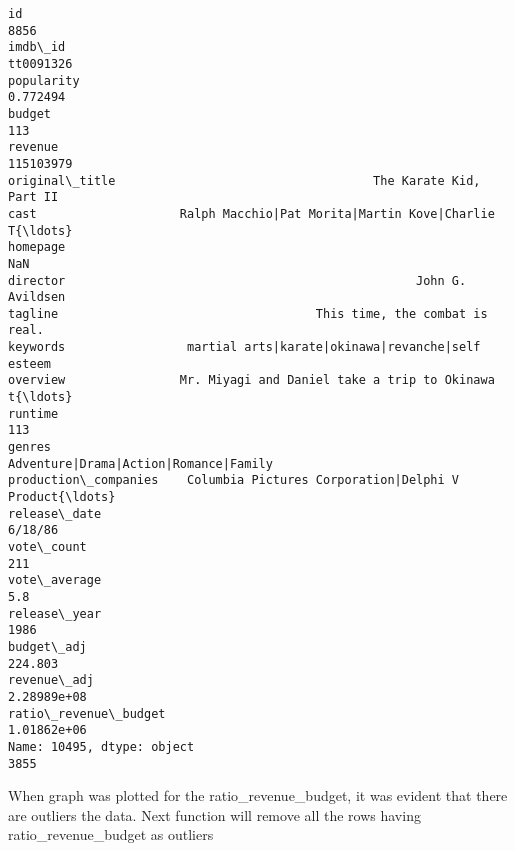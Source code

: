 \documentclass[11pt]{article}
\begin{document}
    \begin{Verbatim}[commandchars=\\\{\}]
id                                                                   8856
imdb\_id                                                         tt0091326
popularity                                                       0.772494
budget                                                                113
revenue                                                         115103979
original\_title                                    The Karate Kid, Part II
cast                    Ralph Macchio|Pat Morita|Martin Kove|Charlie T{\ldots}
homepage                                                              NaN
director                                                 John G. Avildsen
tagline                                    This time, the combat is real.
keywords                 martial arts|karate|okinawa|revanche|self esteem
overview                Mr. Miyagi and Daniel take a trip to Okinawa t{\ldots}
runtime                                                               113
genres                              Adventure|Drama|Action|Romance|Family
production\_companies    Columbia Pictures Corporation|Delphi V Product{\ldots}
release\_date                                                      6/18/86
vote\_count                                                            211
vote\_average                                                          5.8
release\_year                                                         1986
budget\_adj                                                        224.803
revenue\_adj                                                   2.28989e+08
ratio\_revenue\_budget                                          1.01862e+06
Name: 10495, dtype: object
3855

    \end{Verbatim}

    When graph was plotted for the ratio\_revenue\_budget, it was evident
that there are outliers the data. Next function will remove all the rows
having ratio\_revenue\_budget as outliers
\end{document}
